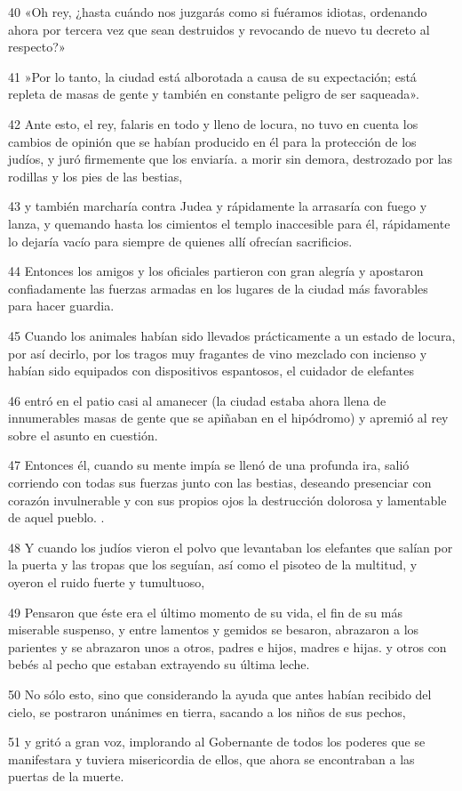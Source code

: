 \par 40 «Oh rey, ¿hasta cuándo nos juzgarás como si fuéramos idiotas, ordenando ahora por tercera vez que sean destruidos y revocando de nuevo tu decreto al respecto?»
\par 41 »Por lo tanto, la ciudad está alborotada a causa de su expectación; está repleta de masas de gente y también en constante peligro de ser saqueada».
\par 42 Ante esto, el rey, falaris en todo y lleno de locura, no tuvo en cuenta los cambios de opinión que se habían producido en él para la protección de los judíos, y juró firmemente que los enviaría. a morir sin demora, destrozado por las rodillas y los pies de las bestias,
\par 43 y también marcharía contra Judea y rápidamente la arrasaría con fuego y lanza, y quemando hasta los cimientos el templo inaccesible para él, rápidamente lo dejaría vacío para siempre de quienes allí ofrecían sacrificios.
\par 44 Entonces los amigos y los oficiales partieron con gran alegría y apostaron confiadamente las fuerzas armadas en los lugares de la ciudad más favorables para hacer guardia.
\par 45 Cuando los animales habían sido llevados prácticamente a un estado de locura, por así decirlo, por los tragos muy fragantes de vino mezclado con incienso y habían sido equipados con dispositivos espantosos, el cuidador de elefantes
\par 46 entró en el patio casi al amanecer (la ciudad estaba ahora llena de innumerables masas de gente que se apiñaban en el hipódromo) y apremió al rey sobre el asunto en cuestión.
\par 47 Entonces él, cuando su mente impía se llenó de una profunda ira, salió corriendo con todas sus fuerzas junto con las bestias, deseando presenciar con corazón invulnerable y con sus propios ojos la destrucción dolorosa y lamentable de aquel pueblo. .
\par 48 Y cuando los judíos vieron el polvo que levantaban los elefantes que salían por la puerta y las tropas que los seguían, así como el pisoteo de la multitud, y oyeron el ruido fuerte y tumultuoso,
\par 49 Pensaron que éste era el último momento de su vida, el fin de su más miserable suspenso, y entre lamentos y gemidos se besaron, abrazaron a los parientes y se abrazaron unos a otros, padres e hijos, madres e hijas. y otros con bebés al pecho que estaban extrayendo su última leche.
\par 50 No sólo esto, sino que considerando la ayuda que antes habían recibido del cielo, se postraron unánimes en tierra, sacando a los niños de sus pechos,
\par 51 y gritó a gran voz, implorando al Gobernante de todos los poderes que se manifestara y tuviera misericordia de ellos, que ahora se encontraban a las puertas de la muerte.

